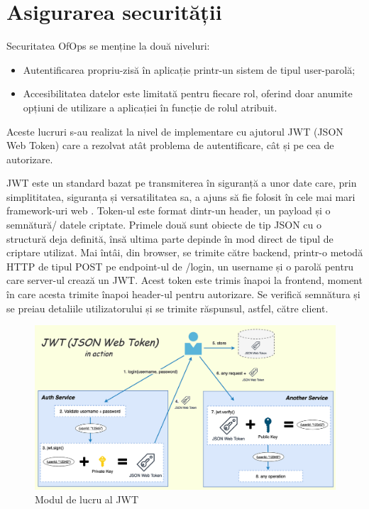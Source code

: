 \vspace{1.5em}
\section{Asigurarea securității}

Securitatea OfOps se menține la două niveluri: \begin{itemize}[left=1.5cm]
    \item Autentificarea propriu-zisă în aplicație printr-un sistem de tipul user-parolă;
    \item Accesibilitatea datelor este limitată pentru fiecare rol, oferind doar anumite opțiuni de utilizare a aplicației în funcție de rolul atribuit.
\end{itemize}

Aceste lucruri s-au realizat la nivel de implementare cu ajutorul JWT (JSON Web Token) care a rezolvat atât problema de autentificare, cât și pe cea de autorizare. 

JWT este un standard bazat pe transmiterea în siguranță a unor date care, prin simplititatea, siguranța și versatilitatea sa, a ajuns să fie folosit în cele mai mari framework-uri web \cite{citation6}. Token-ul este format dintr-un header, un payload și o semnătură/ datele criptate. Primele două sunt obiecte de tip JSON cu o structură deja definită, însă ultima parte depinde în mod direct de tipul de criptare utilizat. Mai întâi, din browser, se trimite către backend, printr-o metodă HTTP de tipul POST pe endpoint-ul de /login, un username și o parolă pentru care server-ul crează un JWT. Acest token este trimis înapoi la frontend, moment în care acesta trimite înapoi header-ul pentru autorizare. Se verifică semnătura și se preiau detaliile utilizatorului și se trimite răspunsul, astfel, către client.
 
\begin{figure}[!htb]
    \centering
    \includegraphics[width=0.9\linewidth]{images/jwt.png}
    \caption{Modul de lucru al JWT}
    \label{fig:jwt}
\end{figure}

